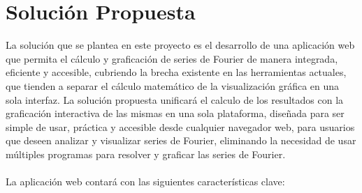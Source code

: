 \section{Solución Propuesta}
La solución que se plantea en este proyecto es el desarrollo de una aplicación web que permita el cálculo y graficación de series de Fourier de manera integrada, eficiente y accesible, cubriendo la brecha existente en las herramientas actuales, que tienden a separar el cálculo matemático de la visualización gráfica en una sola interfaz. La solución propuesta unificará el calculo de los resultados con la graficación interactiva de las mismas en una sola plataforma, diseñada para ser simple de usar, práctica y accesible desde cualquier navegador web, para usuarios que deseen analizar y visualizar series de Fourier, eliminando la necesidad de usar múltiples programas para resolver y graficar las series de Fourier. \\\\
La aplicación web contará con las siguientes características clave:
